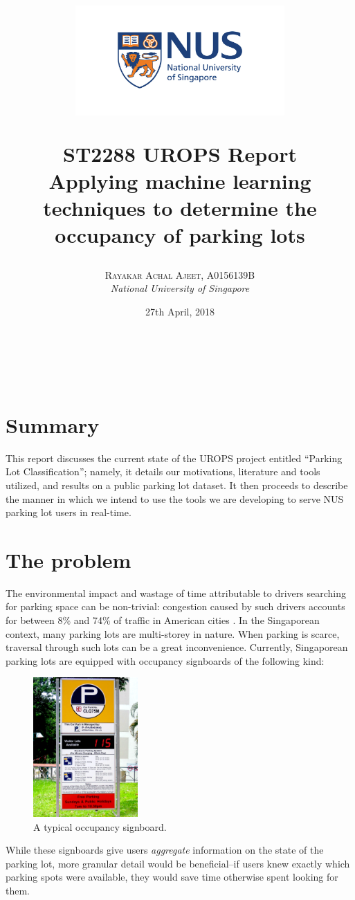 \documentclass[a4paper, 11pt]{article} %
\title{
	\begin{figure}
		\begin{center}
					\includegraphics[width=8cm]{figures/logo.jpg}
		\end{center}
	\end{figure}	
	\textbf{ST2288 UROPS Report
}\\
Applying machine learning techniques to determine the occupancy of parking lots}
\author{\textsc{Rayakar Achal Ajeet, A0156139B}\\
		\textit{National University of Singapore}
}
\date{27th April, 2018}
\makeatletter
\renewcommand{\maketitle}{
\begin{flushright}
	{\LARGE\@title}
	\vspace{50pt} \\
	{\large\@author}
	\\\@date
	\vspace{40pt}
\end{flushright}
}
\makeatother
\begin{document}
\maketitle %

\newpage

\tableofcontents

\newpage

\section{Summary}
    This report discusses the current state of the UROPS project entitled ``Parking Lot Classification''; 
    namely, it details our motivations, literature and tools utilized, and results on a public parking lot 
    dataset. It then proceeds to describe the manner in which we intend to use the tools we are 
    developing to serve NUS parking lot users in real-time.

\section{The problem}
    The environmental impact and wastage of time attributable to drivers searching for parking space 
    can be non-trivial: congestion caused by such drivers accounts for between 8\% and 74\% of traffic 
    in American cities \cite{pollution-paper}\relax. In the Singaporean context, many parking lots are 
    multi-storey in nature. When parking is scarce, traversal through such lots can be a great 
    inconvenience. Currently, Singaporean parking lots are equipped with occupancy signboards of the 
    following kind:
    \vskip 5mm
    \begin{figure}[h]
        \centering
        \includegraphics[width=4cm]{figures/curr_sign.png}
        \caption{A typical occupancy signboard.}
    \end{figure}
    \newpage
    While these signboards give users \textit{aggregate} information on the state of the parking lot, 
    more granular detail would be beneficial--if users knew exactly which parking spots were available, 
    they would save time otherwise spent looking for them. 
    
\end{document}
